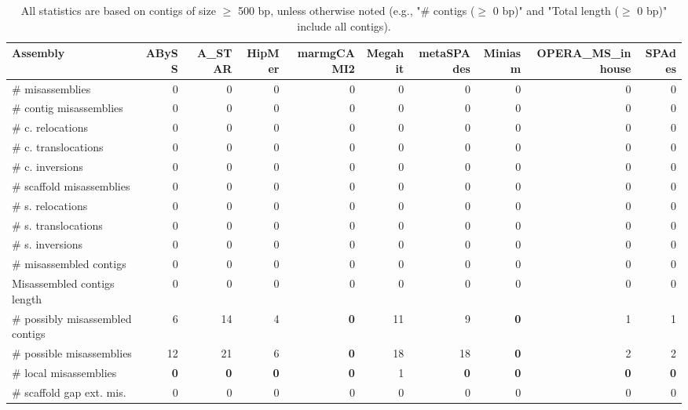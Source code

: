 \documentclass[12pt,a4paper]{article}
\begin{document}
\begin{table}[ht]
\begin{center}
\caption{All statistics are based on contigs of size $\geq$ 500 bp, unless otherwise noted (e.g., "\# contigs ($\geq$ 0 bp)" and "Total length ($\geq$ 0 bp)" include all contigs).}
\begin{tabular}{|l*{9}{|r}|}
\hline
Assembly & ABySS & A\_STAR & HipMer & marmgCAMI2 & Megahit & metaSPAdes & Miniasm & OPERA\_MS\_inhouse & SPAdes \\ \hline
\# misassemblies & 0 & 0 & 0 & 0 & 0 & 0 & 0 & 0 & 0 \\ \hline
\hspace{2mm}\# contig misassemblies & 0 & 0 & 0 & 0 & 0 & 0 & 0 & 0 & 0 \\ \hline
\hspace{5mm}\# c. relocations & 0 & 0 & 0 & 0 & 0 & 0 & 0 & 0 & 0 \\ \hline
\hspace{5mm}\# c. translocations & 0 & 0 & 0 & 0 & 0 & 0 & 0 & 0 & 0 \\ \hline
\hspace{5mm}\# c. inversions & 0 & 0 & 0 & 0 & 0 & 0 & 0 & 0 & 0 \\ \hline
\hspace{2mm}\# scaffold misassemblies & 0 & 0 & 0 & 0 & 0 & 0 & 0 & 0 & 0 \\ \hline
\hspace{5mm}\# s. relocations & 0 & 0 & 0 & 0 & 0 & 0 & 0 & 0 & 0 \\ \hline
\hspace{5mm}\# s. translocations & 0 & 0 & 0 & 0 & 0 & 0 & 0 & 0 & 0 \\ \hline
\hspace{5mm}\# s. inversions & 0 & 0 & 0 & 0 & 0 & 0 & 0 & 0 & 0 \\ \hline
\# misassembled contigs & 0 & 0 & 0 & 0 & 0 & 0 & 0 & 0 & 0 \\ \hline
Misassembled contigs length & 0 & 0 & 0 & 0 & 0 & 0 & 0 & 0 & 0 \\ \hline
\# possibly misassembled contigs & 6 & 14 & 4 & {\bf 0} & 11 & 9 & {\bf 0} & 1 & 1 \\ \hline
\hspace{5mm}\# possible misassemblies & 12 & 21 & 6 & {\bf 0} & 18 & 18 & {\bf 0} & 2 & 2 \\ \hline
\# local misassemblies & {\bf 0} & {\bf 0} & {\bf 0} & {\bf 0} & 1 & {\bf 0} & {\bf 0} & {\bf 0} & {\bf 0} \\ \hline
\# scaffold gap ext. mis. & 0 & 0 & 0 & 0 & 0 & 0 & 0 & 0 & 0 \\ \hline

\end{tabular}
\end{center}
\end{table}
\end{document}

